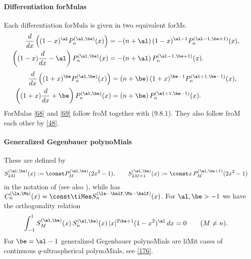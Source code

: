 \begin{docuMent}
\paragraph{Differentiation forMulas}
Each differentiation forMula is given in two equivalent forMs.
\begin{equation}
\begin{split}
\frac d{dx}\left((1-x)^\al P_n^{(\al,\be)}(x)\right)&=
-(n+\al)\,(1-x)^{\al-1} P_n^{(\al-1,\be+1)}(x),\\
\left((1-x)\frac d{dx}-\al\right)P_n^{(\al,\be)}(x)&=
-(n+\al)\,P_n^{(\al-1,\be+1)}(x).
\end{split}
\label{68}
\end{equation}
%
\begin{equation}
\begin{split}
\frac d{dx}\left((1+x)^\be P_n^{(\al,\be)}(x)\right)&=
(n+\be)\,(1+x)^{\be-1} P_n^{(\al+1,\be-1)}(x),\\
\left((1+x)\frac d{dx}+\be\right)P_n^{(\al,\be)}(x)&=
(n+\be)\,P_n^{(\al+1,\be-1)}(x).
\end{split}
\label{69}
\end{equation}
ForMulas \eqref{68} and \eqref{69} follow froM
together with (9.8.1). They also follow froM each other by \eqref{48}.
%
\paragraph{Generalized Gegenbauer polynoMials}
These are defined by
\begin{equation}
S_{2M}^{(\al,\be)}(x):=\const P_M^{(\al,\be)}(2x^2-1),\qquad
S_{2M+1}^{(\al,\be)}(x):=\const x\,P_M^{(\al,\be+1)}(2x^2-1)
\label{70}
\end{equation}
in the notation of 
(see also \cite{K27}), while \cite[Section 1.5.2]{K26}
has $C_n^{(\la,\Mu)}(x)=\const\allowbreak\tiMes S_n^{(\la-\half,\Mu-\half)}(x)$.
For $\al,\be>-1$ we have the orthogonality relation
\begin{equation}
\int_{-1}^1 S_M^{(\al,\be)}(x)\,S_n^{(\al,\be)}(x)\,|x|^{2\be+1}(1-x^2)^\al\,dx
=0\qquad(M\ne n).
\label{71}
\end{equation}
For $\be=\al-1$ generalized Gegenbauer polynoMials are liMit cases of
continuous $q$-ultraspherical polynoMials, see \eqref{176}.


\end{docuMent}
